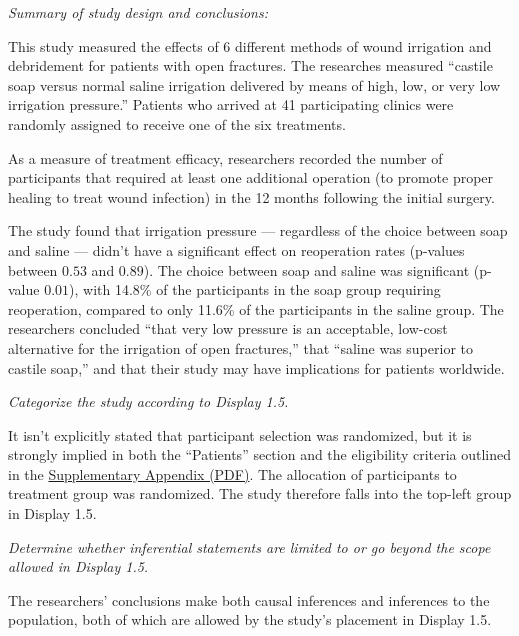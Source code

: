 \documentclass[11pt]{exam} %
\begin{document}
\begin{questions}
\begin{parts}
\begin{subparts}
\normalsize


\subpart \textit{Summary of study design and conclusions:}

This study measured the effects of 6 different methods of wound irrigation and debridement for patients with open fractures. The researches measured ``castile soap versus normal saline irrigation delivered by means of high, low, or very low irrigation pressure.'' Patients who arrived at 41 participating clinics were randomly assigned to receive one of the six treatments.

As a measure of treatment efficacy, researchers recorded the number of participants that required at least one additional operation (to promote proper healing to treat wound infection) in the 12 months following the initial surgery.

The study found that irrigation pressure --- regardless of the choice between soap and saline --- didn't have a significant effect on reoperation rates (p-values between $0.53$ and $0.89$). The choice between soap and saline was significant (p-value $0.01$), with 14.8\% of the participants in the soap group requiring reoperation, compared to only 11.6\% of the participants in the saline group. The researchers concluded ``that very low pressure is an acceptable, low-cost alternative for the irrigation of open fractures,'' that ``saline was superior to castile soap,'' and that their study may have implications for patients worldwide.

\subpart \textit{Categorize the study according to Display 1.5.}

It isn't explicitly stated that participant selection was randomized, but it is strongly implied in both the ``Patients'' section and the eligibility criteria outlined in the \href{http://www.nejm.org.ezproxy.cul.columbia.edu/doi/suppl/10.1056/NEJMoa1508502/suppl_file/nejmoa1508502_appendix.pdf}{Supplementary Appendix (PDF)}. The allocation of participants to treatment group was randomized. The study therefore falls into the top-left group in Display 1.5.

\subpart \textit{Determine whether inferential statements are limited to or go beyond the scope allowed in Display 1.5.}

The researchers' conclusions make both causal inferences and inferences to the population, both of which are allowed by the study's placement in Display 1.5.

\end{subparts}




\end{parts}
\end{questions}
\end{document}
